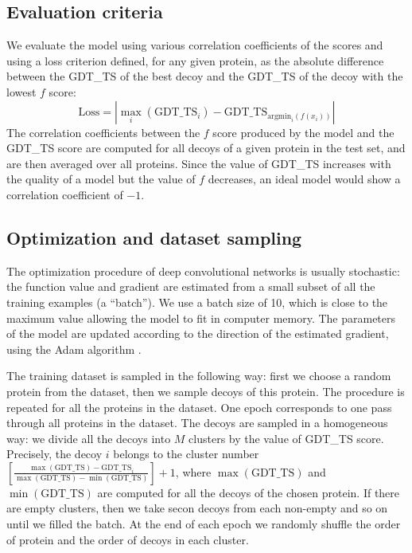\subsection{Evaluation criteria}
We evaluate the model using various correlation coefficients of the
scores and using a loss criterion defined, for any given protein, as
the absolute difference between the GDT\_TS of the best decoy and the
GDT\_TS of the decoy with the lowest $f$ score:
$$ 
\text{Loss} = \left| \max_i( \text{GDT\_TS}_i ) - \text{GDT\_TS}_{\mathrm{argmin}_i(f(x_i))} \right|
$$
%
The correlation coefficients between the $f$ score produced by the
model and the GDT\_TS score are computed for all decoys of a given
protein in the test set, and are then averaged over all
proteins. Since the value of GDT\_TS increases with the quality of a
model but the value of $f$ decreases, an ideal model would show a
correlation coefficient of $-1$.


\subsection{Optimization and dataset sampling}
The optimization procedure of deep convolutional networks is usually
stochastic: the function value and gradient are estimated from a small
subset of all the training examples (a ``batch''). We use a batch size
of 10, which is close to the maximum value allowing the model to fit
in computer memory. The parameters of the model are updated according
to the direction of the estimated gradient, using the Adam algorithm
\cite{kingma2014adam}.

The training dataset is sampled in the following way: first we choose a
random protein from the dataset, then we sample decoys of this
protein.  The procedure is repeated for all the proteins in the
dataset. One epoch corresponds to one pass through all proteins in the
dataset.  The decoys are sampled in a homogeneous way: we divide all
the decoys into $M$ clusters by the value of GDT\_TS score.
Precisely, the decoy $i$ belongs to the cluster number $ \left[
  \frac{\max(\text{GDT\_TS}) - \text{GDT\_TS}_i}{\max(\text{GDT\_TS})
    - \min(\text{GDT\_TS})} \right] + 1$, where $\max(\text{GDT\_TS})$
and $\min(\text{GDT\_TS})$ are computed for all the decoys of the
chosen protein. If there are empty clusters, then we take secon decoys
from each non-empty and so on until we filled the batch.  At the end
of each epoch we randomly shuffle the order of protein and the order
of decoys in each cluster.

